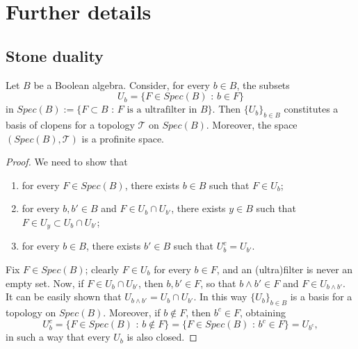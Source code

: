 \chapter{Further details}
\label{cap:Appendix}

\section{Stone duality}
\label{sec:AppendixStone}

\begin{lemma}
\label{lem:Spec(B)}
    Let $B$ be a Boolean algebra. Consider, for every $b\in B$, the subsets
    \[ U_b = \{ F\in Spec(B)\text{ : }b\in F \} \]
    in $Spec(B) := \{ F\subset B\text{ : } F \text{ is a ultrafilter in } B\}$. Then $\{U_b\}_{b\in B}$ constitutes a basis of clopens for a topology $\mathcal{T}$ on $Spec(B)$. Moreover, the space $(Spec(B), \mathcal{T})$ is a profinite space.
    \begin{proof}
        We need to show that
        \begin{enumerate}
            \item for every $F\in Spec(B)$, there exists $b\in B$ such that $F\in U_b$;
            \item for every $b,b'\in B$ and $F\in U_b\cap U_{b'}$, there exists $y\in B$ such that $F\in U_y\subset U_b\cap U_{b'}$;
            \item for every $b\in B$, there exists $b'\in B$ such that $U_b^c = U_{b'}$.
        \end{enumerate}
        Fix $F\in Spec(B)$; clearly $F\in U_b$ for every $b\in F$, and an (ultra)filter is never an empty set. Now, if $F\in U_b\cap U_{b'}$, then $b,b'\in F$, so that $b\wedge b'\in F$ and $F\in U_{b\wedge b'}$. It can be easily shown that $U_{b\wedge b'} = U_b\cap U_{b'}$. In this way $\{U_b\}_{b\in B}$ is a basis for a topology on $Spec(B)$. Moreover, if $b\not\in F$, then $b^c\in F$, obtaining
        \[ U_b^c = \{ F \in Spec(B) \text{ : } b\not\in F \} = \{ F \in Spec(B) \text{ : } b^c\in F \} = U_{b^c}, \]
        in such a way that every $U_b$ is also closed.


\end{proof}
\end{lemma}
